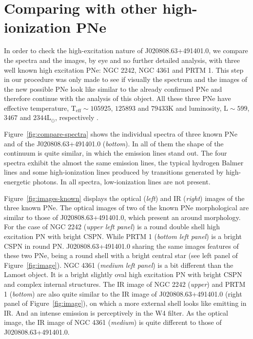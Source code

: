 \documentclass[fleqn,usenatbib]{mnras}
\begin{document}
\section{Comparing with other high-ionization PNe}
\label{sec:comp}

In order to check the high-excitation nature of J020808.63+491401.0,
we compare the spectra and the images, by eye and no further
detailed analysis, with three well known high excitation PNe: NGC 2242,
NGC 4361 and PRTM 1. This step in our procedure was only made
to see if visually the spectrum and the images of the new possible PNe
look like similar to the already confirmed PNe and therefore continue with
the analysis of this object. All these three PNe have effective temperature,
$\mathrm{T_{eff} \sim 105925}$, $125893$ and $79433$K
and luminosity, $\mathrm{L \sim 599}$, $3467$ and $2344$L$_{\odot}$, respectively
\citep{Weidmann:2020}.

Figure~\ref{fig:compare-spectra} shows the individual spectra of three known PNe
and of the J020808.63+491401.0 (\textit{bottom}). In all of them the shape of
the continuum is quite similar, in which the emission lines stand out.
The four spectra exhibit the almost the same emission lines, the typical hydrogen
Balmer lines and some high-ionization lines produced by transitions generated
by high-energetic photons. In all spectra, low-ionization lines are not present.

Figure~\ref{fig:images-known} displays the optical (\textit{left}) and IR (\textit{right})
images of the three known PNe. The optical images of two of the known
PNe morphological are similar to those of J020808.63+491401.0, which present
an around morphology. For the case of NGC 2242 (\textit{upper left panel}) is a
round double shell high excitation PN
with bright CSPN. While  PRTM 1 (\textit{bottom left panel}) is a bright CSPN in
round PN. J020808.63+491401.0 sharing the same images features of these two PNe,
being a round shell with a bright central star
(see left panel of Figure~\ref{fig:image}). NGC 4361 (\textit{medium left panel}) is a
bit different than the Lamost object. It is a bright slightly oval high excitation PN
with bright CSPN and complex internal structures. The IR image of NGC 2242 (\textit{upper})
and PRTM 1 (\textit{bottom}) are also quite
similar  to the IR image  of J020808.63+491401.0 (right panel of Figure~\ref{fig:image}),
on which a more external shell looks like emitting in IR. And an intense emission
is perceptively in the W4 filter. As the optical image, the IR image of
NGC 4361 (\textit{medium}) is quite different to those of J020808.63+491401.0.
\end{document}
